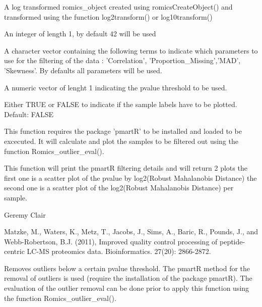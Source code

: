 \documentclass[a4paper]{book}
\begin{document}
%
\begin{Arguments}
\begin{ldescription}
\item[\code{romics\_object}] A log transformed romics\_object created using romicsCreateObject() and transformed using the function log2transform() or log10transform()

\item[\code{seed}] An integer of length 1, by default 42 will be used

\item[\code{metrics}] A character vector containing the following terms to indicate which parameters to use for the filtering of the data : 'Correlation', 'Proportion\_Missing','MAD', 'Skewness'. By defaults all parameters will be used.

\item[\code{pvalue\_threshold}] A numeric vector of lenght 1 indicating the pvalue threshold to be used.

\item[\code{label}] Either TRUE or FALSE to indicate if the sample labels have to be plotted. Default: FALSE
\end{ldescription}
\end{Arguments}
%
\begin{Details}
This function requires the package 'pmartR' to be installed and loaded to be excecuted. It will calculate and plot the samples to be filtered out using the function Romics\_outlier\_eval().
\end{Details}
%
\begin{Value}
This function will print the pmartR filtering details and will return 2 plots the first one is a scatter plot of the pvalue by log2(Robust Mahalanobis Distance) the second one is a scatter plot of the log2(Robust Mahalanobis Distance) per sample.
\end{Value}
%
\begin{Author}
Geremy Clair
\end{Author}
%
\begin{References}
Matzke, M., Waters, K., Metz, T., Jacobs, J., Sims, A., Baric, R., Pounds, J., and Webb-Robertson, B.J. (2011), Improved quality control processing of peptide-centric LC-MS proteomics data. Bioinformatics. 27(20): 2866-2872.
\end{References}
%
\begin{Description}
Removes outliers below a certain pvalue threshold. The pmartR method for the removal of outliers is used (require the installation of the package pmartR). The evaluation of the outlier removal can be done prior to apply this function using the function Romics\_outlier\_eval().
\end{Description}
\end{document}
